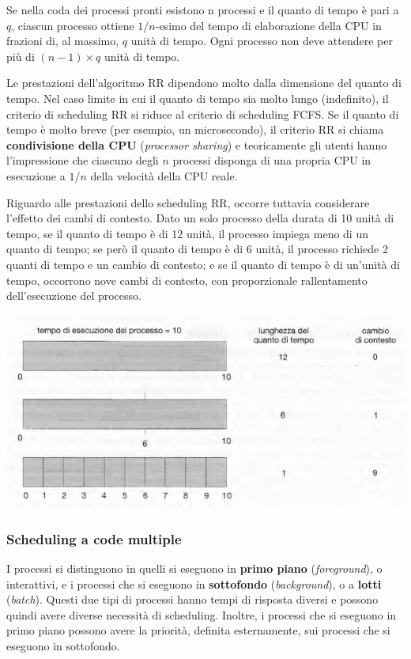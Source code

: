 \documentclass[11pt,a4paper]{article}
\begin{document}
Se nella coda dei processi pronti esistono n processi e il quanto di tempo è pari a $q$, ciascun processo ottiene $1/n$-esimo del tempo di elaborazione della CPU in frazioni di, al mas­simo, $q$ unità di tempo. Ogni processo non deve attendere per più di $(n-1)\times q$ unità di
tempo.

Le prestazioni dell'algoritmo RR dipendono molto dalla dimensione del quanto di
tempo. Nel caso limite in cui il quanto di tempo sia molto lungo (indefinito), il criterio di
scheduling RR si riduce al criterio di scheduling FCFS. Se il quanto di tempo è molto breve
(per esempio, un microsecondo), il criterio RR si chiama \textbf{condivisione della CPU} (\emph{processor
sharing}) e teoricamente gli utenti hanno l'impressione che ciascuno degli $n$ processi dispon­ga di una propria CPU in esecuzione a $1/n$ della velocità della CPU reale.

Riguardo alle prestazioni dello scheduling RR, occorre tuttavia considerare l'effetto dei
cambi di contesto. Dato un solo processo della durata di 10 unità di tempo, se il quanto di
tempo è di 12 unità, il processo impiega meno di un quanto di tempo; se però il quanto di
tempo è di 6 unità, il processo richiede 2 quanti di tempo e un cambio di contesto; e se il
quanto di tempo è di un'unità di tempo, occorrono nove cambi di contesto, con proporzio­nale rallentamento dell'esecuzione del processo.

\begin{center}
  \includegraphics[scale=0.5]{img/0022.png}
\end{center}

\subsubsection{Scheduling a code multiple}
I processi si distinguono in quelli si eseguono in \textbf{primo piano} (\emph{foreground}), o interattivi, e i proces­si che si eseguono in \textbf{sottofondo} (\emph{background}), o a \textbf{lotti} (\emph{batch}). Questi due tipi di processi
hanno tempi di risposta diversi e possono quindi avere diverse necessità di scheduling. Inol­tre, i processi che si eseguono in primo piano possono avere la priorità, definita esterna­mente, sui processi che si eseguono in sottofondo.
\end{document}
